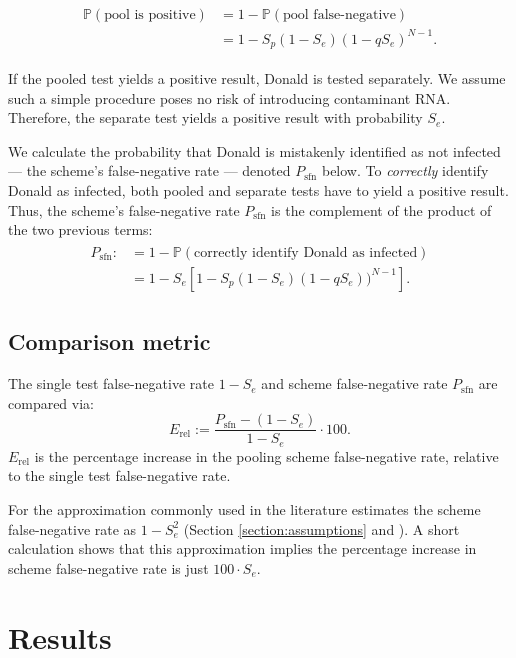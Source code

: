 \documentclass{article}
\newcommand{\Se}{S_e}
\newcommand{\Sp}{S_p}
\newcommand{\mi}{P_{\text{sfn}}}
\newcommand{\rel}{E_{\text{rel}}}
\renewcommand{\Pr}{\mathbb{P}}
\begin{document}
\begin{align}
    \begin{split}
        \Pr(\text{pool is positive}) &= 1 - \Pr(\text{pool false-negative}) \\
        &= 1 - \Sp(1-\Se)(1-q\Se)^{N-1}.
    \end{split}
\end{align}

If the pooled test yields a positive result, Donald is tested separately. We assume such a simple procedure poses no risk of introducing contaminant RNA. Therefore, the separate test yields a positive result with probability $\Se$. 

We calculate the probability that Donald is mistakenly identified as not infected --- the scheme's false-negative rate --- denoted $\mi$ below. To \emph{correctly} identify Donald as infected, both pooled and separate tests have to yield a positive result. Thus, the scheme's false-negative rate $\mi$ is the complement of the product of the two previous terms:
\begin{align}\label{eq:sfn}
    \begin{split}
        \mi :&= 1-\Pr(\text{correctly identify Donald as infected})\\
        &= 1 - \Se\left [1 - \Sp(1-\Se)(1-q\Se))^{N-1}\right].
    \end{split}
\end{align}

\subsection{Comparison metric}
The single test false-negative rate $1-\Se$ and scheme false-negative rate $\mi$ are compared via:
\begin{equation}\label{eq:erel}
\rel := \frac{\mi - (1-\Se)}{1-\Se} \cdot 100.
\end{equation}
$\rel$ is the percentage increase in the pooling scheme false-negative rate, relative to the single test false-negative rate.

For the approximation commonly used in the literature estimates the scheme false-negative rate as $1-\Se^2$ (Section \ref{section:assumptions} and \cite{Simplistic1, Simplistic2, Kim, OptimalDorfmanPool}). A short calculation shows that this approximation implies the percentage increase in scheme false-negative rate is just $100\cdot \Se$.

\section{Results}\label{section:results}
\end{document}
